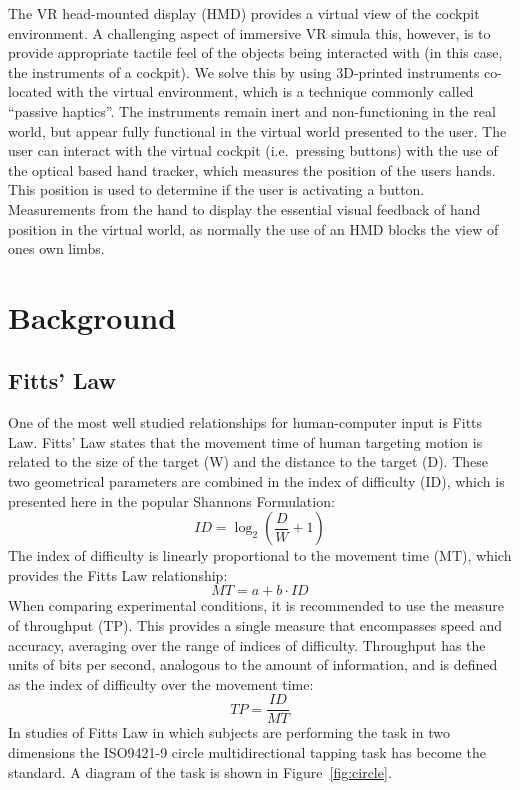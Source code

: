 \documentclass[]{aiaa-tc}%
\begin{document}
The VR head-mounted display (HMD) provides a virtual view of the cockpit environment.
A challenging aspect of immersive VR simula this, however, is to provide appropriate tactile feel of the objects being interacted with (in this case, the instruments of a cockpit).
We solve this by using 3D-printed instruments co-located with the virtual environment, which is a technique commonly called ``passive haptics''.
The instruments remain inert and non-functioning in the real world, but appear fully functional in the virtual world presented to the user.
The user can interact with the virtual cockpit (i.e.\ pressing buttons) with the use of the optical based hand tracker, which measures the position of the users hands.
This position is used to determine if the user is activating a button.
Measurements from the hand to display the essential visual feedback of hand position in the virtual world, as normally the use of an HMD blocks the view of ones own limbs.

\section{Background}
\subsection{Fitts' Law}
One of the most well studied relationships for human-computer input is Fitts Law\cite{fitts}.
Fitts' Law states that the movement time of human targeting motion is related to the size of the target (W) and the distance to the target (D).
These two geometrical parameters are combined in the index of difficulty (ID), which is presented here in the popular Shannons Formulation\cite{shannons}:
\begin{equation}
  ID=\log_2\left(\frac{D}{W}+1\right)
\end{equation}
The index of difficulty is linearly proportional to the movement time (MT), which provides the Fitts Law relationship:
\begin{equation}
  MT=a+b \cdot ID
\end{equation}
When comparing experimental conditions, it is recommended to use the measure of throughput (TP)\cite{four}.
This provides a single measure that encompasses speed and accuracy, averaging over the range of indices of difficulty.
Throughput has the units of bits per second, analogous to the amount of information, and is defined as the index of difficulty over the movement time:
\begin{equation}
  TP=\frac{ID}{MT}
\end{equation}
In studies of Fitts Law in which subjects are performing the task in two dimensions the ISO9421-9 circle multidirectional tapping task has become the standard\cite{five}.
A diagram of the task is shown in Figure~\ref{fig:circle}.
\end{document}
